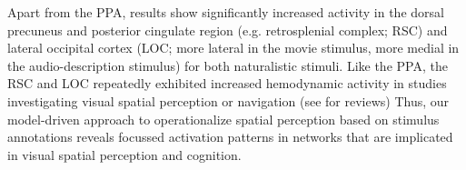 \documentclass[english]{article}
\begin{document}

Apart from the PPA, results show significantly increased activity in the dorsal
precuneus and posterior cingulate region (e.g. retrosplenial complex; RSC) and
lateral occipital cortex (LOC; more lateral in the movie stimulus, more medial
in the audio-description stimulus) for both naturalistic stimuli.
Like the PPA, the RSC and LOC repeatedly exhibited increased hemodynamic
activity in studies investigating visual spatial perception or navigation (see
\citep{chrastil2018heterogeneity, bettencourt2013role, epstein2019scene} for
reviews)
Thus, our model-driven approach to operationalize spatial perception based on
stimulus annotations reveals focussed activation patterns in networks that are
implicated in visual spatial perception and cognition.
\end{document}
